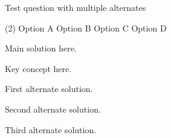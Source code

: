 
\item Test question with multiple alternates

\begin{tasks}(2)
\task Option A
\task Option B \ans
\task Option C
\task Option D
\end{tasks}

\begin{solution}
Main solution here.
\end{solution}

\begin{idea}
Key concept here.
\end{idea}

\begin{alternatesolution}
First alternate solution.
\end{alternatesolution}

\begin{alternatesolution}
Second alternate solution.
\end{alternatesolution}

\begin{alternatesolution}
Third alternate solution.
\end{alternatesolution}
